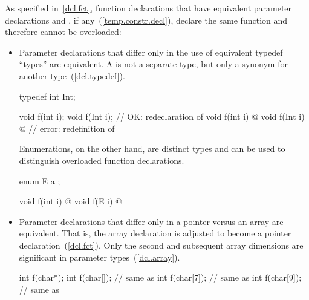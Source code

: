 \pnum
{}%
%
\begin{note}
As specified in~\ref{dcl.fct},
function declarations that have equivalent parameter declarations
and , if any~(\ref{temp.constr.decl}),
declare
the same function and therefore cannot
be overloaded:

\begin{itemize}
\item
{}%
Parameter declarations that differ only in the use of equivalent typedef
``types'' are equivalent.
A
is not a separate type, but only a synonym for another type~(\ref{dcl.typedef}).
\begin{example}
\begin{codeblock}
typedef int Int;

void f(int i);
void f(Int i);                  // OK: redeclaration of 
void f(int i) { @\commentellip@ }
void f(Int i) { @\commentellip@ }     // error: redefinition of 
\end{codeblock}
\end{example}

%
Enumerations, on the other hand, are distinct types and can be used to
distinguish
overloaded function declarations.
\begin{example}
\begin{codeblock}
enum E { a };

void f(int i) { @\commentellip@ }
void f(E i)   { @\commentellip@ }
\end{codeblock}
\end{example}

\item
{}%
%
Parameter declarations that differ only in a pointer
\tcode{*}
versus an array
\tcode{[]}
are equivalent.
That is, the array declaration is adjusted to become a pointer
declaration~(\ref{dcl.fct}).
Only the second and subsequent array dimensions are significant in
parameter types~(\ref{dcl.array}).
\begin{example}

\begin{codeblock}
int f(char*);
int f(char[]);                  // same as 
int f(char[7]);                 // same as 
int f(char[9]);                 // same as 


\end{codeblock}
\end{example}
\end{itemize}
\end{note}
